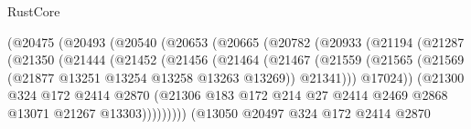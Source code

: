 \begin{lexlean}{RustCore}
\begin{coremodule}
                        (@20475
                          (@20493
                            (@20540
                              (@20653
                                (@20665
                                  (@20782
                                    (@20933
                                      (@21194
                                        (@21287
                                          (@21350
                                            (@21444
                                              (@21452
                                                (@21456
                                                  (@21464
                                                    (@21467
                                                      (@21559
                                                        (@21565
                                                          (@21569
                                                            (@21877
                                                              @13251
                                                              @13254
                                                              @13258
                                                              @13263
                                                              @13269))
                                                          @21341)))
                                                    @17024))
                                                (@21300
                                                  @324
                                                  @172
                                                  @2414
                                                  @2870
                                                  (@21306
                                                    @183
                                                    @172
                                                    @214
                                                    @27
                                                    @2414
                                                    @2469
                                                    @2868
                                                    @13071
                                                    @21267
                                                    @13303)))))))))
                                  (@13050
                                    @20497
                                    @324
                                    @172
                                    @2414
                                    @2870

\end{coremodule}
\end{lexlean}
